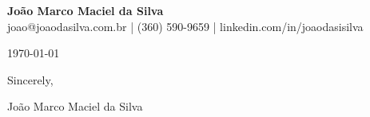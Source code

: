 \documentclass[11pt,letterpaper]{article}
\newcommand{\MYNAME}{João Marco Maciel da Silva}
\begin{document}
\begin{center}
\textbf{\Large{\MYNAME}}\\
joao@joaodasilva.com.br |
(360) 590-9659 |
linkedin.com/in/joaodasisilva
\end{center}

\noindent\today

\vspace{0.3cm}



\vspace{0.3cm}

Sincerely,

\vspace{0.4cm}

\MYNAME
\end{document}

